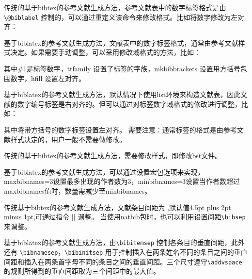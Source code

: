 
传统的基于bibtex的参考文献生成方法，参考文献表中的数字标签格式是由 \verb|\@biblabel| 控制的，可以通过重定义该命令来修改格式。比如将数字修改为左对齐：
\begin{texlist}
\makeatletter
\renewcommand\@biblabel[1]{[#1]\hfill}
\makeatother
\end{texlist}

基于biblatex的参考文献生成方法，文献表中的数字标签格式，通常由参考文献样式决定。如果需要手动调整，可以采用修改域格式的方法，比如：
\begin{texlist}
\end{texlist}
其中\#1是标签数字，ttfamily 设置了标签的字族，mkbibbrackets 设置用方括号包围数字，hfill 设置左对齐。




基于biblatex的参考文献生成方法，默认情况下使用list环境来构造文献表，因此文献的数字编号标签是右对齐的。但可以通过对标签数字域格式的修改进行调整，比如：
\begin{texlist}
\end{texlist}
其中将带方括号的数字标签设置左对齐。
需要注意：通常标签的格式是由参考文献样式决定的，用户一般不需要做修改。





传统的基于bibtex的参考文献生成方法，需要修改样式，即修改bst文件。

基于biblatex的参考文献生成方法，可以通过设置宏包选项来实现，maxbibnames=3设置最多出现的作者数为3，minbibnames=3设置当作者数超过maxbibnames值时，数量需减少至minbibnames。






传统基于bibtex的参考文献生成方法，文献条目间距为 ,默认值4.5pt plus 2pt minus
1pt,可通过指令 |\addtolength{\itemsep}{距离}| 调整。
当使用natbib包时，也可以利用设置间距\verb|\bibsep|来调整。

基于biblatex的参考文献生成方法，由\verb|\bibitemsep| 控制各条目的垂直间距，此外还有
\verb|\bibnamesep|，\verb|\bibinitsep| 用于控制插入在两条姓名不同的条目之间的垂直间距和插入在两条首字母不同的条目之间的垂直间距。三个尺寸遵守\verb|\addvspace| 的规则所得到的垂直间距取为三个间距中的最大值。


